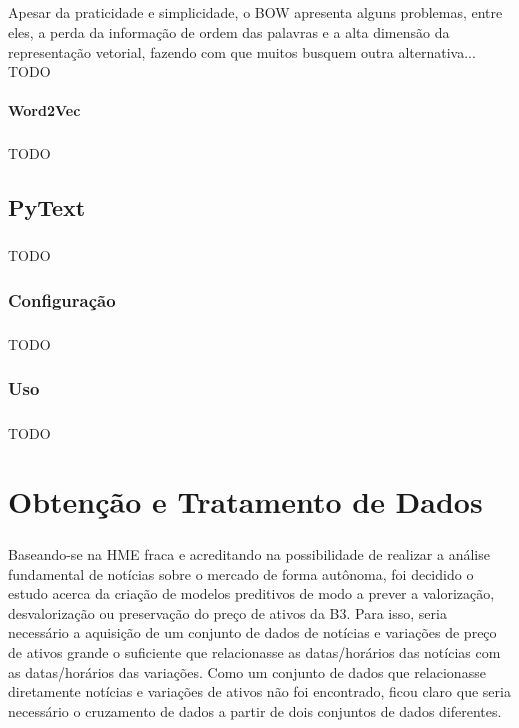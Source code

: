 \documentclass[grad,numbers]{coppe}
\begin{document}
  		\paragraph{}Apesar da praticidade e simplicidade, o BOW apresenta alguns problemas, entre eles, a perda da informação de ordem das palavras e a alta dimensão da representação vetorial, fazendo com que muitos busquem outra alternativa... TODO
  		\subsubsection{Word2Vec}
  			\paragraph{}TODO
	
  \section{PyText}
  	\paragraph{}TODO
  	\subsection{Configuração}
  		\paragraph{}TODO
  	\subsection{Uso}
  		\paragraph{}TODO
  
  \chapter{Obtenção e Tratamento de Dados}
  	\paragraph{}Baseando-se na HME fraca e acreditando na possibilidade de realizar a análise fundamental de notícias sobre o mercado de forma autônoma, foi decidido o estudo acerca da criação de modelos preditivos de modo a prever a valorização, desvalorização ou preservação do preço de ativos da B3. Para isso, seria necessário a aquisição de um conjunto de dados de notícias e variações de preço de ativos grande o suficiente que relacionasse as datas/horários das notícias com as datas/horários das variações. Como um conjunto de dados que relacionasse diretamente notícias e variações de ativos não foi encontrado, ficou claro que seria necessário o cruzamento de dados a partir de dois conjuntos de dados diferentes.
\end{document}
